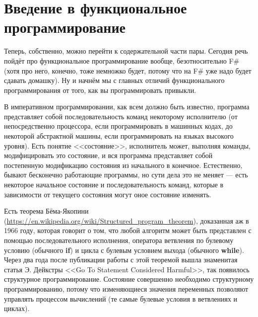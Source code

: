\documentclass[a5paper]{article}
\begin{document}
\section{Введение в функциональное программирование}

Теперь, собственно, можно перейти к содержательной части пары. Сегодня речь пойдёт про функциональное программирование вообще, безотносительно F\# (хотя про него, конечно, тоже немножко будет, потому что на F\# уже надо будет сдавать домашку). Ну и начнём мы с главных отличий функционального программирования от того, как вы программировать привыкли.

В императивном программировании, как всем должно быть известно, программа представляет собой последовательность команд некоторому исполнителю (от непосредственно процессора, если программировать в машинных кодах, до некоторой абстрактной машины, если программировать на языках высокого уровня). Есть понятие <<состояние>>, исполнитель может, выполняя команды, модифицировать это состояние, и вся программа представляет собой постепенную модификацию состояния из начального в конечное. Естественно, бывают бесконечно работающие программы, но сути дела это не меняет --- есть некоторое начальное состояние и последовательность команд, которые в зависимости от текущего состояния могут оное состояние изменять.

Есть теорема Бёма-Якопини (\url{https://en.wikipedia.org/wiki/Structured_program_theorem}), доказанная аж в 1966 году, которая говорит о том, что любой алгоритм может быть представлен с помощью последовательного исполнения, оператора ветвления по булевому условию (обычного \textbf{if}) и цикла с булевым условием выхода (обычного \textbf{while}). Через два года после публикации работы с этой теоремой вышла знаменитая статья Э. Дейкстры <<Go To Statement Considered Harmful>>, так появилось структурное программирование. Состояние совершенно необходимо структурному программированию, потому что изменяющиеся значения переменных позволяют управлять процессом вычислений (те самые булевые условия в ветвлениях и циклах). 
\end{document}

